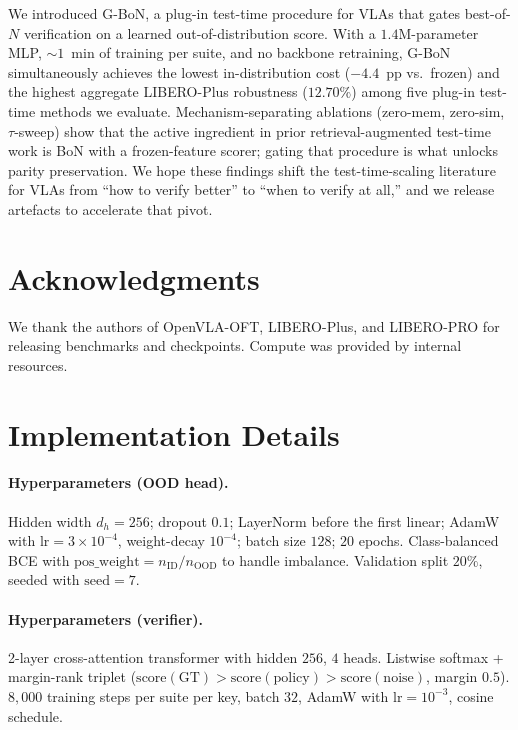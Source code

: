 \documentclass{article}
\begin{document}
We introduced G-BoN, a plug-in test-time procedure for VLAs that
gates best-of-$N$ verification on a learned out-of-distribution
score. With a $1.4$M-parameter MLP, $\sim\!1$~min of training per
suite, and no backbone retraining, G-BoN simultaneously achieves
the lowest in-distribution cost ($-4.4$~pp vs.\ frozen) and the
highest aggregate LIBERO-Plus robustness ($12.70\%$) among five
plug-in test-time methods we evaluate. Mechanism-separating ablations
(zero-mem, zero-sim, $\tau$-sweep) show that the active ingredient
in prior retrieval-augmented test-time work is BoN with a
frozen-feature scorer; gating that procedure is what unlocks
parity preservation. We hope these findings shift the test-time-scaling
literature for VLAs from ``how to verify better'' to ``when to
verify at all,'' and we release artefacts to accelerate that pivot.

\section*{Acknowledgments}
We thank the authors of OpenVLA-OFT, LIBERO-Plus, and LIBERO-PRO
for releasing benchmarks and checkpoints. Compute was provided by
internal resources.




\appendix

\section{Implementation Details}
\label{appendix:impl}

\paragraph{Hyperparameters (OOD head).}
Hidden width $d_h{=}256$; dropout $0.1$; LayerNorm before the first
linear; AdamW with $\mathrm{lr}{=}3\!\times\!10^{-4}$, weight-decay
$10^{-4}$; batch size $128$; $20$ epochs. Class-balanced BCE with
$\mathrm{pos\_weight}{=}n_{\mathrm{ID}}/n_{\mathrm{OOD}}$ to handle
imbalance. Validation split $20\%$, seeded with $\mathrm{seed}{=}7$.

\paragraph{Hyperparameters (verifier).}
2-layer cross-attention transformer with hidden $256$, $4$ heads.
Listwise softmax + margin-rank triplet
($\mathrm{score}(\mathrm{GT}) > \mathrm{score}(\mathrm{policy}) > \mathrm{score}(\mathrm{noise})$,
margin $0.5$). $8{,}000$ training steps per suite per key,
batch $32$, AdamW with $\mathrm{lr}{=}10^{-3}$, cosine schedule.
\end{document}
